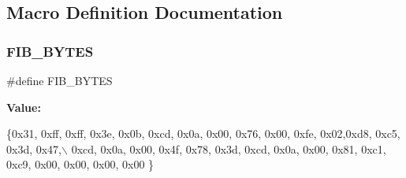 \subsection{Macro Definition Documentation}
\mbox{\label{unit-test-cartridge_8c_a933a9d1eb2addc828ac17247c266bb2b}} 
\subsubsection{\texorpdfstring{F\+I\+B\+\_\+\+B\+Y\+T\+ES}{FIB\_BYTES}}
{\footnotesize\ttfamily \#define F\+I\+B\+\_\+\+B\+Y\+T\+ES}

{\bfseries Value\+:}
\begin{DoxyCode}
\{0x31, 0xff, 0xff, 0x3e, 0x0b, 0xcd, 0x0a, 0x00, 0x76, 0x00, 0xfe, 0x02,0xd8, 0xc5, 0x3d, 0x47,\(\backslash\)
           0xcd, 0x0a, 0x00, 0x4f, 0x78, 0x3d, 0xcd, 0x0a, 0x00, 0x81, 0xc1, 0xc9, 0x00, 0x00, 0x00, 0x00 \}
\end{DoxyCode}

